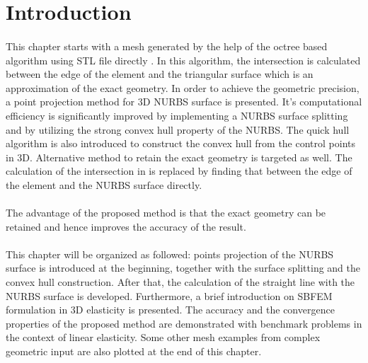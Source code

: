 \section{Introduction}
\paragraph{}
This chapter starts with a mesh generated by the help of the octree based algorithm using STL file directly \citep{Liu2017}.
In this algorithm, the intersection is calculated between the edge of the element and the triangular surface which is an approximation of the exact geometry.
In order to achieve the geometric precision, a point projection method for 3D NURBS surface is presented.
It's computational efficiency is significantly improved by implementing a NURBS surface splitting and by utilizing the strong convex hull property of the NURBS.
The quick hull algorithm is also introduced to construct the convex hull from the control points in 3D.
Alternative method to retain the exact geometry is targeted as well.
The calculation of the intersection in \cite{Liu2017} is replaced by finding that between the edge of the element and the NURBS surface directly.

\paragraph{}
The advantage of the proposed method is that the exact geometry can be retained and hence improves the accuracy of the result.

\paragraph{}
This chapter will be organized as followed:
points projection of the NURBS surface is introduced at the beginning, together with the surface splitting and the convex hull construction.
After that, the calculation of the straight line with the NURBS surface is developed.
Furthermore, a brief introduction on SBFEM formulation in 3D elasticity is presented.
The accuracy and the convergence properties of the proposed method are demonstrated with benchmark problems in the context of linear elasticity.
Some other mesh examples from complex geometric input are also plotted at the end of this chapter.